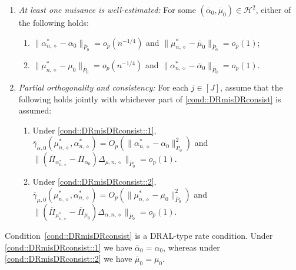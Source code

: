 \documentclass[11pt]{article}
\theoremstyle{plain}
\begin{document}
 
\begin{enumerate}[label=\bf{C\arabic*)}, ref={C\arabic*}, series=cond1]
  \item \textit{At least one nuisance is well-estimated:}
  \label{cond::DRlimits}\label{cond::DRmisDRconsist}
  For some $(\overline{\alpha}_0,\overline{\mu}_0) \in \mathcal{H}^2$, either of the following holds:
  \begin{enumerate}[label={\roman*)}, ref={\ref{cond::DRlimits}\roman*}]
    \item \label{cond::DRmisDRconsist::1}
    $\|\alpha_{n,\diamond}^* - \alpha_0 \|_{\overline{P}_0} = o_p(n^{-1/4})$ and $\|\mu_{n,\diamond}^* - \overline{\mu}_0\|_{\overline{P}_0} = o_p(1)$;
    \item \label{cond::DRmisDRconsist::2}
    $\|\mu_{n,\diamond}^* - \mu_0\|_{\overline{P}_0} = o_p(n^{-1/4})$ and $\|\alpha_{n,\diamond}^* - \overline{\alpha}_0\|_{\overline{P}_0} = o_p(1)$.
  \end{enumerate}

\item \textit{Partial orthogonality and consistency:}
\label{cond::mainprojectioncoupling1}
For each $j \in [J]$, assume that the following holds jointly with whichever
part of \ref{cond::DRmisDRconsist} is assumed:
\begin{enumerate}[label={\roman*)}, ref={\ref{cond::mainprojectioncoupling1}\roman*}]\vspace{-.05in}
  \item \label{cond::mainprojectioncoupling1:i}
  Under \ref{cond::DRmisDRconsist::1},
  $ \overline{\gamma}_{\alpha,0}(\mu_{n, \diamond}^*, \alpha_{n, \diamond}^*) = O_p(  \|\alpha_{n,\diamond}^* - \alpha_0\|_{\overline{P}_0}^2) $ and
  $\|(\overline{\Pi}_{\alpha_{n,\diamond}^*} - \overline{\Pi}_{\alpha_0})\Delta_{\mu,n,\diamond}\|_{\overline{P}_0}
  = o_p(1)$. 
  \item \label{cond::mainprojectioncoupling1:ii}
  Under \ref{cond::DRmisDRconsist::2}, 
  $\overline{\gamma}_{\mu,0}(\mu_{n, \diamond}^*, \alpha_{n, \diamond}^*) =  O_p( \|\mu_{n,\diamond}^* - \mu_0\|_{\overline{P}_0}^2)$ and
  $\|(\overline{\Pi}_{\mu_{n,\diamond}^*} - \overline{\Pi}_{\mu_0})\Delta_{\alpha,n,\diamond}\|_{\overline{P}_0}
  = o_p(1)$.
\end{enumerate}
\end{enumerate}
Condition~\ref{cond::DRmisDRconsist} is a DRAL-type rate condition. Under
\ref{cond::DRmisDRconsist::1} we have $\overline{\alpha}_0=\alpha_0$, whereas
under \ref{cond::DRmisDRconsist::2} we have $\overline{\mu}_0=\mu_0$.
\end{document}
